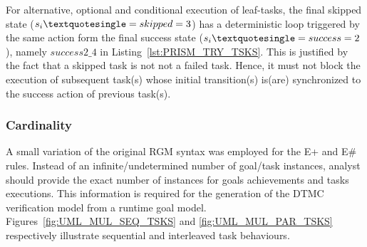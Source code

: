 For alternative, optional and conditional execution of leaf-tasks, the final skipped state ($s_i\squote=skipped=3$) has a deterministic loop triggered by the same action form the final success state ($s_i\squote=success=2$), namely $success2\_4$ in Listing~\ref{lst:PRISM_TRY_TSKS}. This is justified by the fact that a skipped task is not not a failed task. Hence, it must not block the execution of subsequent task(s) whose initial transition(s) is(are) synchronized to the success action of previous task(s).

\subsubsection{Cardinality}

A small variation of the original RGM syntax was employed for the E+ and E\# rules. Instead of an infinite/undetermined number of goal/task instances, analyst should provide the exact number of instances for goals achievements and tasks executions. This information is required for the generation of the DTMC verification model from a runtime goal model. Figures~\ref{fig:UML_MUL_SEQ_TSKS} and \ref{fig:UML_MUL_PAR_TSKS} respectively illustrate sequential and interleaved task behaviours.

